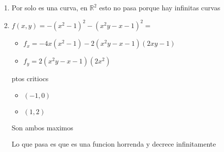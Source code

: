 \documentclass[../practica_06.tex]{subfiles}
\begin{document}
    \begin{enumerate}
        \item Por solo es una curva, en $\mathbb{R}^2$ esto no pasa porque hay infinitas curvas
        \item $f(x,y) = -(x^2-1)^2 - (x^2y-x-1)^2 = $
        
        \begin{itemize}
            \item $ f_x = -4x(x^2-1) - 2(x^2y-x-1)(2xy-1) $
            \item $ f_y = 2(x^2y-x-1)(2x^2) $
        \end{itemize}

        ptos critiocs \begin{itemize}
            \item $(-1,0)$
            \item $(1,2)$
        \end{itemize}

        Son ambos maximos

        Lo que pasa es que es una funcion horrenda y decrece infinitamente

    \end{enumerate}
\end{document}
